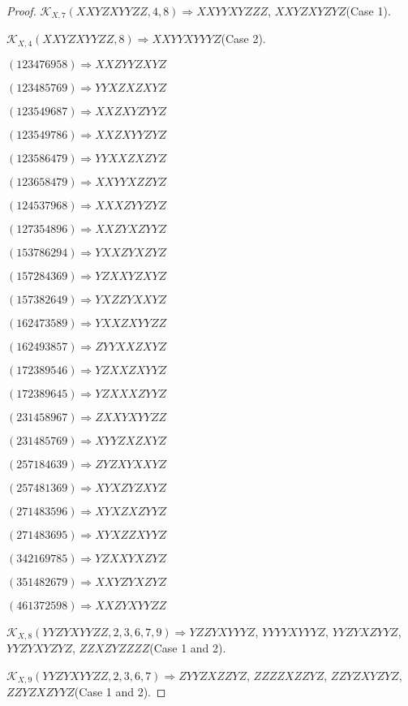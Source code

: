 \documentclass[12pt]{article}
\theoremstyle{plain}
\theoremstyle{definition}
\theoremstyle{remark}
\newcommand{\fancy}[1]{\mathcal{#1}}
\def\K{\fancy{K}}
\begin{document}
\begin{proof}
	$\K_{X,7}(XXYZXYYZZ,4, 8)\Rightarrow $$XXYYXYZZZ$, $XXYZXYZYZ$(Case 1).
	
	$\K_{X,4}(XXYZXYYZZ,8)\Rightarrow $$XXYYXYYYZ$(Case 2).
	
	
	
	$(1 2 3 4 7 6 9 5 8)\Rightarrow XXZYYZXYZ$
	
	$(1 2 3 4 8 5 7 6 9)\Rightarrow YYXZXZXYZ$
	
	$(1 2 3 5 4 9 6 8 7)\Rightarrow XXZXYZYYZ$
	
	$(1 2 3 5 4 9 7 8 6)\Rightarrow XXZXYYZYZ$
	
	$(1 2 3 5 8 6 4 7 9)\Rightarrow YYXXZXZYZ$
	
	$(1 2 3 6 5 8 4 7 9)\Rightarrow XXYYXZZYZ$
	
	$(1 2 4 5 3 7 9 6 8)\Rightarrow XXXZYYZYZ$
	
	$(1 2 7 3 5 4 8 9 6)\Rightarrow XXZYXZYYZ$
	
	$(1 5 3 7 8 6 2 9 4)\Rightarrow YXXZYXZYZ$
	
	$(1 5 7 2 8 4 3 6 9)\Rightarrow YZXXYZXYZ$
	
	$(1 5 7 3 8 2 6 4 9)\Rightarrow YXZZYXXYZ$
	
	$(1 6 2 4 7 3 5 8 9)\Rightarrow YXXZXYYZZ$
	
	$(1 6 2 4 9 3 8 5 7)\Rightarrow ZYYXXZXYZ$
	
	$(1 7 2 3 8 9 5 4 6)\Rightarrow YZXXZXYYZ$
	
	$(1 7 2 3 8 9 6 4 5)\Rightarrow YZXXXZYYZ$
	
	$(2 3 1 4 5 8 9 6 7)\Rightarrow ZXXYXYYZZ$
	
	$(2 3 1 4 8 5 7 6 9)\Rightarrow XYYZXZXYZ$
	
	$(2 5 7 1 8 4 6 3 9)\Rightarrow ZYZXYXXYZ$
	
	$(2 5 7 4 8 1 3 6 9)\Rightarrow XYXZYZXYZ$
	
	$(2 7 1 4 8 3 5 9 6)\Rightarrow XYXZXZYYZ$
	
	$(2 7 1 4 8 3 6 9 5)\Rightarrow XYXZZXYYZ$
	
	$(3 4 2 1 6 9 7 8 5)\Rightarrow YZXXYXZYZ$
	
	$(3 5 1 4 8 2 6 7 9)\Rightarrow XXYZYXZYZ$
	
	$(4 6 1 3 7 2 5 9 8)\Rightarrow XXZYXYYZZ$
	
	
	
	$\K_{X,8}(YYZYXYYZZ,2, 3, 6, 7, 9)\Rightarrow $$YZZYXYYYZ$, $YYYYXYYYZ$, $YYZYXZYYZ$, $YYZYXYZYZ$, $ZZXZYZZZZ$(Case 1 and 2).
	
	$\K_{X,9}(YYZYXYYZZ,2, 3, 6, 7)\Rightarrow $$ZYYZXZZYZ$, $ZZZZXZZYZ$, $ZZYZXYZYZ$, $ZZYZXZYYZ$(Case 1 and 2).
	

\end{proof}
\end{document}
